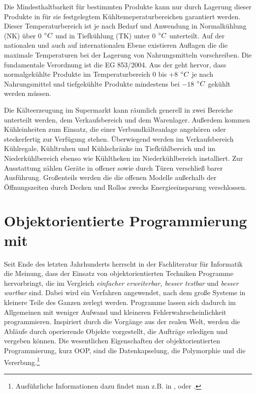 Die Mindesthaltbarkeit f\"ur bestimmten Produkte kann nur durch Lagerung
dieser Produkte in f\"ur sie festgelegtem K\"uhltemeperaturbereichen
garantiert werden. Dieser Temperaturbereich ist je nach Bedarf und Anwendung in
Normalk\"uhlung (NK) über 0 $^\circ C$ und in
Tiefk\"uhlung (TK) unter 0 $^\circ C$ unterteilt. Auf der
nationalen und auch auf internationalen Ebene existieren Auflagen die die
maximale Temperaturen bei der Lagerung von Nahrungsmitteln vorschreiben. Die
fundamentale Verordnung ist die EG 853/2004. Aus der geht hervor, dass
normalgekühlte Produkte im Temperaturbereich 0 bis $+8$ $^\circ C$ je nach
Nahrungsmittel und tiefgekühlte Produkte mindestens bei $-18$ $^\circ C$ gekühlt
werden müssen.

Die K\"alteerzeugung im Supermarkt kann r\"aumlich generell in zwei Bereiche
unterteilt werden, dem Verkaufsbereich und dem Warenlager. Au\ss erdem kommen
K\"uhleinheiten zum Einsatz, die einer Verbundk\"alteanlage angeh\"oren oder
steckerfertig zur Verf\"ugung stehen. \"Uberwiegend werden im Verkaufsbereich
K\"uhlregale, K\"uhltruhen und K\"uhlschr\"anke im Tiefk\"uhlbereich und im
Niederk\"uhlbereich ebenso wie K\"uhltheken im Niederk\"uhlbereich installiert.
Zur Ausstattung z\"ahlen Ger\"ate in offener sowie durch T\"uren verschlie\ss
barer Ausf\"uhrung. Gro\ss enteils werden die die offenen Modelle au\ss erhalb
der \"Offnungszeiten durch Decken und Rollos zwecks Energieeinsparung
verschlossen.


\section{Objektorientierte Programmierung mit \matlab}

Seit Ende des letzten Jahrhunderts herrscht in der Fachliteratur für Informatik
die Meinung, dass der Einsatz von objektorientierten Techniken Programme
hervorbringt, die im Vergleich \textit{einfacher erweiterbar, besser testbar}
und \textit{besser wartbar} sind. Dabei wird
ein Verfahren angewendet, nach dem große Systeme in kleinere Teile des Ganzen
zerlegt werden. Programme lassen sich dadurch im Allgemeinen mit weniger Aufwand
und kleineren Fehlerwahrscheinlichkeit programmieren. Inspiriert durch die
Vorgänge aus der realen Welt, werden die Abläufe durch operierende Objekte
vorgestellt, die Aufträge erledigen und vergeben können. Die wesentlichen
Eigenschaften der objektorientierten Programmierung, kurz
OOP, sind die Datenkapselung, die
Polymorphie und die Vererbung.\footnote{ Ausführliche Informationen dazu findet
man z.B.  in \cite{OOP},\cite{java} oder \cite{python}.}


